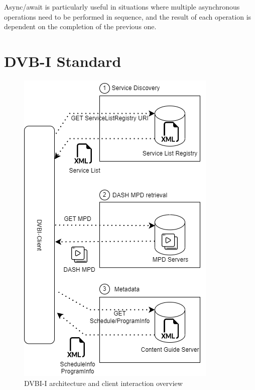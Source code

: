 \documentclass[conference]{IEEEtran}
\begin{document}
Async/await is particularly useful in situations where multiple asynchronous operations need to be performed in sequence, and the result of each operation is dependent on the completion of the previous one. 


\section{DVB-I Standard}

\begin{figure}[ht]
	\centerline{\includegraphics[width=\linewidth]{figures/DVBI-architecture.png}}
	\caption{DVBI-I architecture and client interaction overview}
	\label{dvbi-architecture}
\end{figure}
\end{document}
